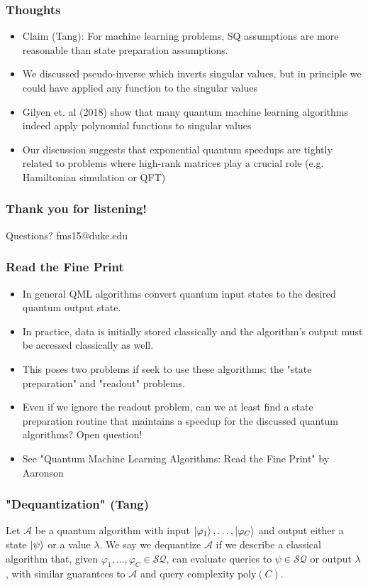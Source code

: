 \documentclass{beamer}
\newcommand\0{\mathbf{0}}
\newcommand\<{\langle}
\renewcommand\>{\rangle}
\renewcommand\phi{\varphi}
\begin{document}
\begin{frame}
\frametitle{Thoughts}	

\begin{itemize}
\item Claim (Tang): For machine learning problems, SQ assumptions are more reasonable than state preparation assumptions.
\item We discussed pseudo-inverse which inverts singular values, but in principle we could have applied any function to the singular values
\item Gilyen et. al (2018) show that many quantum machine learning algorithms indeed apply polynomial functions to singular values
\item Our discussion suggests that exponential quantum speedups are tightly related to problems where high-rank matrices play a crucial role (e.g. Hamiltonian simulation or QFT)
\end{itemize}
\end{frame}

\begin{frame}
\frametitle{Thank you for listening!}

Questions? fms15@duke.edu	
\end{frame}





\begin{frame}
\frametitle{Read the Fine Print}	
\begin{itemize}
\item In general QML algorithms convert quantum input states to the desired quantum output state. 
\item In practice, data is initially stored classically and the algorithm's output must be accessed classically as well.
\item This poses two problems if seek to use these algorithms: the "state preparation" and "readout" problems.
\item Even if we ignore the readout problem, can we at least find a state preparation routine that maintains a speedup for the discussed quantum algorithms? Open question!
\item See "Quantum Machine Learning Algorithms: Read the Fine Print" by Aaronson
\end{itemize}
\end{frame}

\begin{frame}
\frametitle{"Dequantization" (Tang)}
\begin{definition}
 Let $\mathcal{A}$ be a quantum algorithm with input $\ket{\phi_1},\ldots,\ket{\phi_C}$ and output either a state $\ket{\psi}$ or a value $\lambda$. We say we dequantize $\mathcal{A}$ if we describe a classical algorithm that, given $\phi_1,\ldots,\phi_C \in \mathcal{SQ}$, can evaluate queries to $\psi \in \mathcal{SQ}$ or output $\lambda$, with similar guarantees to $\mathcal{A}$ and query complexity $\text{poly}(C)$.	
\end{definition}
\end{frame}

 
\end{document}
